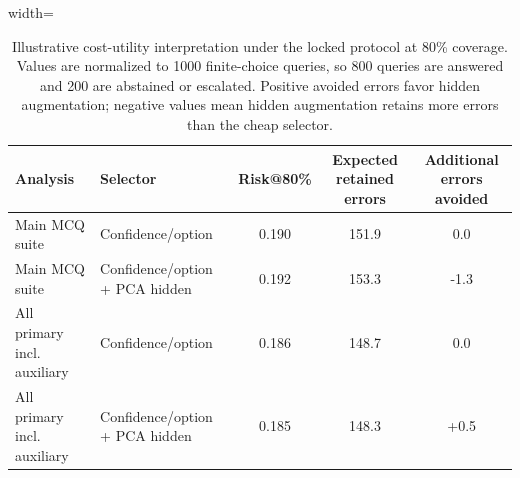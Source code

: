 
\begin{table}[t]
\centering
\small
\caption{Illustrative cost-utility interpretation under the locked protocol at 80\% coverage. Values are normalized to 1000 finite-choice queries, so 800 queries are answered and 200 are abstained or escalated. Positive avoided errors favor hidden augmentation; negative values mean hidden augmentation retains more errors than the cheap selector.}
\label{tab:locked-cost-utility}
\begin{adjustbox}{width=\textwidth}
\begin{tabular}{llccc}
\toprule
Analysis & Selector & Risk@80\% & Expected retained errors & Additional errors avoided \\
\midrule
Main MCQ suite & Confidence/option & 0.190 & 151.9 & 0.0 \\
Main MCQ suite & Confidence/option + PCA hidden & 0.192 & 153.3 & -1.3 \\
All primary incl. auxiliary & Confidence/option & 0.186 & 148.7 & 0.0 \\
All primary incl. auxiliary & Confidence/option + PCA hidden & 0.185 & 148.3 & +0.5 \\
\bottomrule
\end{tabular}
\end{adjustbox}
\end{table}
